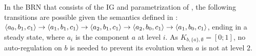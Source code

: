 \begin{example*}
In the BRN that consists of the IG and parametrization of , the following
transitions are possible given the semantics defined in :
$\mbox{$\langle a_0, b_1, c_1 \rangle$} \rightarrow \mbox{$\langle a_1, b_1, c_1 \rangle$} \rightarrow \mbox{$\langle a_2, b_1, c_1 \rangle$} \rightarrow
\mbox{$\langle a_2, b_0, c_1 \rangle$} \rightarrow \mbox{$\langle a_1, b_0, c_1 \rangle$}$,
ending in a steady state,
where $a_i$ is the component $a$ at level $i$.
As $K_{b,\{a\},\emptyset} = [0 ; 1]$, no auto-regulation on $b$ is needed to prevent its evolution when $a$ is not at level $2$.
\end{example*}


